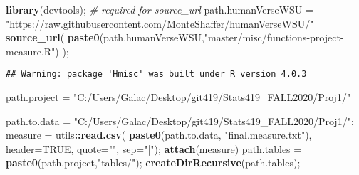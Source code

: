 \documentclass[]{article}
\newenvironment{Shaded}{\begin{snugshade}}{\end{snugshade}}
\newcommand{\CommentTok}[1]{\textcolor[rgb]{0.56,0.35,0.01}{\textit{#1}}}
\newcommand{\DataTypeTok}[1]{\textcolor[rgb]{0.13,0.29,0.53}{#1}}
\newcommand{\KeywordTok}[1]{\textcolor[rgb]{0.13,0.29,0.53}{\textbf{#1}}}
\newcommand{\NormalTok}[1]{#1}
\newcommand{\OperatorTok}[1]{\textcolor[rgb]{0.81,0.36,0.00}{\textbf{#1}}}
\newcommand{\OtherTok}[1]{\textcolor[rgb]{0.56,0.35,0.01}{#1}}
\newcommand{\StringTok}[1]{\textcolor[rgb]{0.31,0.60,0.02}{#1}}
\begin{document}
\vskip -8.5pt




\noindent  

\begin{Shaded}
\begin{Highlighting}[]
\KeywordTok{library}\NormalTok{(devtools);       }\CommentTok{\# required for source\_url}
\NormalTok{path.humanVerseWSU =}\StringTok{ "https://raw.githubusercontent.com/MonteShaffer/humanVerseWSU/"}
\KeywordTok{source\_url}\NormalTok{( }\KeywordTok{paste0}\NormalTok{(path.humanVerseWSU,}\StringTok{"master/misc/functions{-}project{-}measure.R"}\NormalTok{) );}
\end{Highlighting}
\end{Shaded}

\begin{verbatim}
## Warning: package 'Hmisc' was built under R version 4.0.3
\end{verbatim}

\begin{Shaded}
\begin{Highlighting}[]
\NormalTok{path.project =}\StringTok{ "C:/Users/Galac/Desktop/git419/Stats419\_FALL2020/Proj1/"}

\NormalTok{path.to.data =}\StringTok{ "C:/Users/Galac/Desktop/git419/Stats419\_FALL2020/Proj1/"}\NormalTok{;}
\NormalTok{measure =}\StringTok{ }\NormalTok{utils}\OperatorTok{::}\KeywordTok{read.csv}\NormalTok{( }\KeywordTok{paste0}\NormalTok{(path.to.data, }\StringTok{"final.measure.txt"}\NormalTok{), }\DataTypeTok{header=}\OtherTok{TRUE}\NormalTok{, }\DataTypeTok{quote=}\StringTok{""}\NormalTok{, }\DataTypeTok{sep=}\StringTok{"|"}\NormalTok{);}
\KeywordTok{attach}\NormalTok{(measure)}
\NormalTok{path.tables =}\StringTok{ }\KeywordTok{paste0}\NormalTok{(path.project,}\StringTok{"tables/"}\NormalTok{);}
  \KeywordTok{createDirRecursive}\NormalTok{(path.tables);}
\end{Highlighting}
\end{Shaded}
\end{document}
